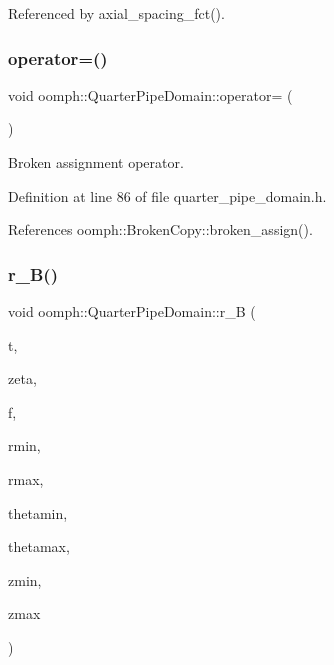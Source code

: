 Referenced by axial\+\_\+spacing\+\_\+fct().

\mbox{\label{classoomph_1_1QuarterPipeDomain_ab6aec719fb0b333abf3ef9a1bf0414ac}} 
\subsubsection{\texorpdfstring{operator=()}{operator=()}}
{\footnotesize\ttfamily void oomph\+::\+Quarter\+Pipe\+Domain\+::operator= (\begin{DoxyParamCaption}\item[{const \hyperlink{classoomph_1_1QuarterPipeDomain}{Quarter\+Pipe\+Domain} \&}]{ }\end{DoxyParamCaption})\hspace{0.3cm}{\ttfamily [inline]}}



Broken assignment operator. 



Definition at line 86 of file quarter\+\_\+pipe\+\_\+domain.\+h.



References oomph\+::\+Broken\+Copy\+::broken\+\_\+assign().

\mbox{\label{classoomph_1_1QuarterPipeDomain_aba1af5e7f1bc6e88ff8e9ee59e965630}} 
\subsubsection{\texorpdfstring{r\+\_\+\+B()}{r\_B()}}
{\footnotesize\ttfamily void oomph\+::\+Quarter\+Pipe\+Domain\+::r\+\_\+B (\begin{DoxyParamCaption}\item[{const unsigned \&}]{t,  }\item[{const \hyperlink{classoomph_1_1Vector}{Vector}$<$ double $>$ \&}]{zeta,  }\item[{\hyperlink{classoomph_1_1Vector}{Vector}$<$ double $>$ \&}]{f,  }\item[{const double \&}]{rmin,  }\item[{const double \&}]{rmax,  }\item[{const double \&}]{thetamin,  }\item[{const double \&}]{thetamax,  }\item[{const double \&}]{zmin,  }\item[{const double \&}]{zmax }\end{DoxyParamCaption})\hspace{0.3cm}{\ttfamily [private]}}



